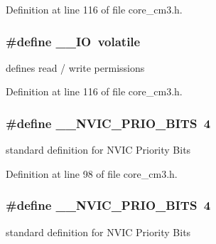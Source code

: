 Definition at line 116 of file core\+\_\+cm3.\+h.

\subsubsection[{\texorpdfstring{\+\_\+\+\_\+\+IO}{__IO}}]{\setlength{\rightskip}{0pt plus 5cm}\#define \+\_\+\+\_\+\+IO~volatile}\hypertarget{group___c_m_s_i_s___c_m3__core__definitions_gaec43007d9998a0a0e01faede4133d6be}{}\label{group___c_m_s_i_s___c_m3__core__definitions_gaec43007d9998a0a0e01faede4133d6be}
defines \textquotesingle{}read / write\textquotesingle{} permissions 

Definition at line 116 of file core\+\_\+cm3.\+h.

\subsubsection[{\texorpdfstring{\+\_\+\+\_\+\+N\+V\+I\+C\+\_\+\+P\+R\+I\+O\+\_\+\+B\+I\+TS}{__NVIC_PRIO_BITS}}]{\setlength{\rightskip}{0pt plus 5cm}\#define \+\_\+\+\_\+\+N\+V\+I\+C\+\_\+\+P\+R\+I\+O\+\_\+\+B\+I\+TS~4}\hypertarget{group___c_m_s_i_s___c_m3__core__definitions_gae3fe3587d5100c787e02102ce3944460}{}\label{group___c_m_s_i_s___c_m3__core__definitions_gae3fe3587d5100c787e02102ce3944460}
standard definition for N\+V\+IC Priority Bits 

Definition at line 98 of file core\+\_\+cm3.\+h.

\subsubsection[{\texorpdfstring{\+\_\+\+\_\+\+N\+V\+I\+C\+\_\+\+P\+R\+I\+O\+\_\+\+B\+I\+TS}{__NVIC_PRIO_BITS}}]{\setlength{\rightskip}{0pt plus 5cm}\#define \+\_\+\+\_\+\+N\+V\+I\+C\+\_\+\+P\+R\+I\+O\+\_\+\+B\+I\+TS~4}\hypertarget{group___c_m_s_i_s___c_m3__core__definitions_gae3fe3587d5100c787e02102ce3944460}{}\label{group___c_m_s_i_s___c_m3__core__definitions_gae3fe3587d5100c787e02102ce3944460}
standard definition for N\+V\+IC Priority Bits 

